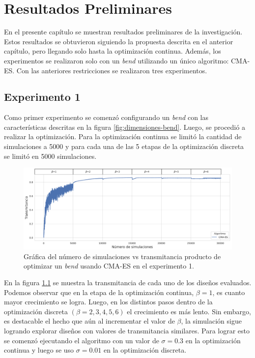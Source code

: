 \chapter{Resultados Preliminares}

En el presente capítulo se muestran resultados preliminares de la investigación.
Estos resultados se obtuvieron siguiendo la propuesta descrita en el anterior capítulo, pero llegando solo hasta la optimización continua.
Además, los experimentos se realizaron solo con un \emph{bend} utilizando un único algoritmo: CMA-ES.
Con las anteriores restricciones se realizaron tres experimentos.


\section{Experimento 1}

Como primer experimento se comenzó configurando un \emph{bend} con las características descritas en la figura \ref{fig:dimensiones-bend}.
Luego, se procedió a realizar la optimización.
Para la optimización continua se limitó la cantidad de simulaciones a 5000 y para cada una de las 5 etapas de la optimización discreta se limitó en 5000 simulaciones.

\begin{figure}[ht]
  \centering
  \includegraphics[width=\textwidth]{image/results/iterations_v1.png}
  \caption{Gráfica del número de simulaciones vs transmitancia producto de optimizar un \emph{bend} usando CMA-ES en el experimento 1.}
  \label{fig:iterations-v1}
\end{figure}

En la figura \ref{fig:iterations-v1} se muestra la transmitancia de cada uno de los diseños evaluados.
Podemos observar que en la etapa de la optimización continua, $\beta = 1$, es cuanto mayor crecimiento se logra.
Luego, en los distintos pasos dentro de la optimización discreta $(\beta = 2, 3, 4, 5, 6)$ el crecimiento es más lento.
Sin embargo, es destacable el hecho que aún al incrementar el valor de $\beta$, la simulación sigue logrando explorar diseños con valores de transmitancia similares.
Para lograr esto se comenzó ejecutando el algoritmo con un valor de $\sigma = 0.3$ en la optimización continua y luego se uso $\sigma = 0.01$ en la optimización discreta.


